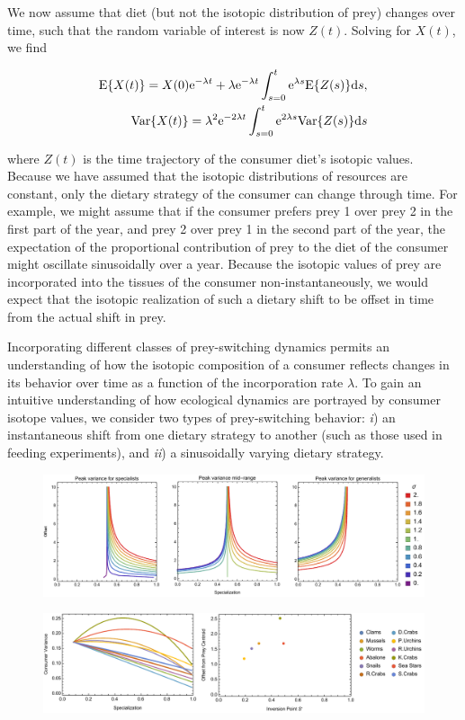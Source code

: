 \documentclass[11pt]{article}
\begin{document}
We now assume that diet (but not the isotopic distribution of prey) changes over time, such that the random variable of interest is now $Z(t)$.
Solving for $X(t)$, we find

\begin{align}
{\rm E}\{X(t)\} = X(0){\rm e}^{-\lambda t} + \lambda{\rm e}^{-\lambda t} \int_{s=0}^t {\rm e}^{\lambda s} {\rm E}\{Z(s)\}{\rm d}s, \nonumber \\
{\rm Var}\{X(t)\} = \lambda^2 {\rm e}^{-2\lambda t} \int_{s=0}^t {\rm e}^{2\lambda s} {\rm Var}\{Z(s)\} {\rm d}s
\end{align}

\noindent where $Z(t)$ is the time trajectory of the consumer diet's isotopic values.
Because we have assumed that the isotopic distributions of resources are constant, only the dietary strategy of the consumer can change through time.
For example, we might assume that if the consumer prefers prey 1 over prey 2 in the first part of the year, and prey 2 over prey 1 in the second part of the year, the expectation of the proportional contribution of prey to the diet of the consumer might oscillate sinusoidally over a year.
Because the isotopic values of prey are incorporated into the tissues of the consumer non-instantaneously, we would expect that the isotopic realization of such a dietary shift to be offset in time from the actual shift in prey.

Incorporating different classes of prey-switching dynamics permits an understanding of how the isotopic composition of a consumer reflects changes in its behavior over time as a function of the incorporation rate $\lambda$.
To gain an intuitive understanding of how ecological dynamics are portrayed by consumer isotope values, we consider two types of prey-switching behavior: {\it i}) an instantaneous shift from one dietary strategy to another (such as those used in feeding experiments), and {\it ii}) a sinusoidally varying dietary strategy.





\begin{figure}[h!]
\centering
\includegraphics[width=1\textwidth]{fig_specvar.pdf}
\caption{
}
\end{figure}



\begin{figure}[h!]
\centering
\includegraphics[width=1\textwidth]{fig_ottervar.pdf}
\caption{
}
\end{figure}
\end{document}
